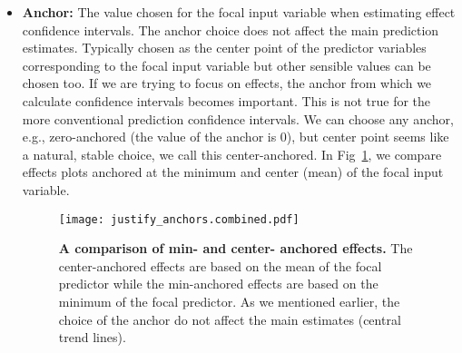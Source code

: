 \begin{itemize}
\item \textbf{Anchor:} The value chosen for the focal input variable when estimating effect confidence intervals. The anchor choice does not affect the main prediction estimates. Typically chosen as the center point of the predictor variables corresponding to the focal input variable but other sensible values can be chosen too. If we are trying to focus on effects, the anchor from which we calculate confidence intervals becomes important. This is not true for the more conventional prediction confidence intervals. We can choose any anchor, e.g., zero-anchored (the value of the anchor is $0$), but center point seems like a natural, stable choice, we call this center-anchored. In Fig~\ref{fig:justify_anchors}, we compare effects plots anchored at the minimum and center (mean) of the focal input variable.
%
\begin{figure}
\begin{center}
\texttt{[image: justify\_anchors.combined.pdf]}
\end{center}
\caption{{\bf A comparison of min- and center- anchored effects.} The center-anchored effects are based on the mean of the focal predictor while the min-anchored effects are based on the minimum of the focal predictor. As we mentioned earlier, the choice of the anchor do not affect the main estimates (central trend lines).} 
\label{fig:justify_anchors}
\end{figure}
%

\end{itemize}

